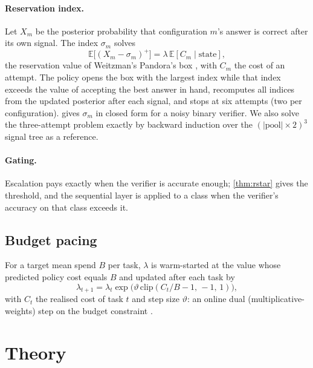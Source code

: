 \documentclass[11pt,a4paper]{article}
\theoremstyle{definition}
\theoremstyle{remark}
\theoremstyle{definition}
\newcommand{\E}{\mathbb{E}}
\begin{document}
\paragraph{Reservation index.}
Let $X_m$ be the posterior probability that configuration $m$'s answer is correct after its own signal. The index $\sigma_m$ solves
\begin{equation}
\E\big[(X_m-\sigma_m)^+\big]=\lambda\,\E[C_m\mid\text{state}],
\label{eq:pandora}
\end{equation}
the reservation value of Weitzman's Pandora's box \cite{weitzman1979}, with $C_m$ the cost of an attempt. The policy opens the box with the largest index while that index exceeds the value of accepting the best answer in hand, recomputes all indices from the updated posterior after each signal, and stops at six attempts (two per configuration).  gives $\sigma_m$ in closed form for a noisy binary verifier. We also solve the three-attempt problem exactly by backward induction over the $(|\text{pool}|\times2)^3$ signal tree as a reference.

\paragraph{Gating.}
Escalation pays exactly when the verifier is accurate enough; \cref{thm:rstar} gives the threshold, and the sequential layer is applied to a class when the verifier's accuracy on that class exceeds it.

\subsection{Budget pacing}
\label{sec:pacing}
For a target mean spend $B$ per task, $\lambda$ is warm-started at the value whose predicted policy cost equals $B$ and updated after each task by
\begin{equation}
\lambda_{t+1}=\lambda_t\exp\!\big(\vartheta\,\mathrm{clip}(C_t/B-1,\,-1,\,1)\big),
\label{eq:pacing}
\end{equation}
with $C_t$ the realised cost of task $t$ and step size $\vartheta$: an online dual (multiplicative-weights) step on the budget constraint \cite{balseiro2020,agrawal2014}.

\section{Theory}
\label{sec:theory}
\end{document}
